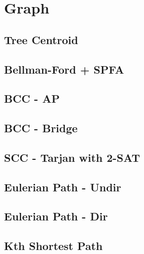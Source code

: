 \documentclass[a4paper,10pt,twocolumn,oneside]{article}
\begin{document}
\section{Graph}

\subsection{Tree Centroid}


\subsection{Bellman-Ford + SPFA}


\subsection{BCC - AP}


\subsection{BCC - Bridge}


\subsection{SCC - Tarjan with 2-SAT}


\subsection{Eulerian Path - Undir}


\subsection{Eulerian Path - Dir}


%

\subsection{Kth Shortest Path}

\end{document}
